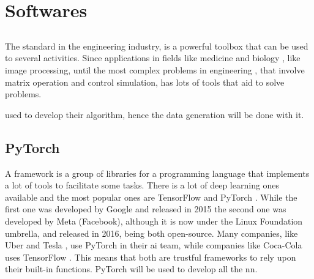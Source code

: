 \section{Softwares}

\subsection{\matlab}

The standard in the engineering industry, \matlab is a powerful toolbox that can be used to several activities.
Since applications in fields like medicine and biology \citep{demirkaya2009}, like image processing, until the most complex problems in engineering \citep{bansal}, that involve matrix operation and control simulation, \matlab has lots of tools that aid to solve problems.

\citet{geronel2023} used \matlab to develop their algorithm, hence the data generation will be done with it.

\subsection{PyTorch}

A framework is a group of libraries for a programming language that implements a lot of tools to facilitate some tasks. 
There is a lot of deep learning ones available and the most popular ones are TensorFlow \citep{abadi2016} and PyTorch \citep{paszke2019}. 
While the first one was developed by Google and released in 2015 the second one was developed by Meta (Facebook), although it is now under the Linux Foundation umbrella, and released in 2016, being both open-source.
Many companies, like Uber \citep{goodman2017} and Tesla \citep{pytorch2019}, use PyTorch in their \gls*{ai} team, while companies like Coca-Cola uses TensorFlow \citep{tensorflow2018}.
This means that both are trustful frameworks to rely upon their built-in functions.
PyTorch will be used to develop all the \gls*{nn}.